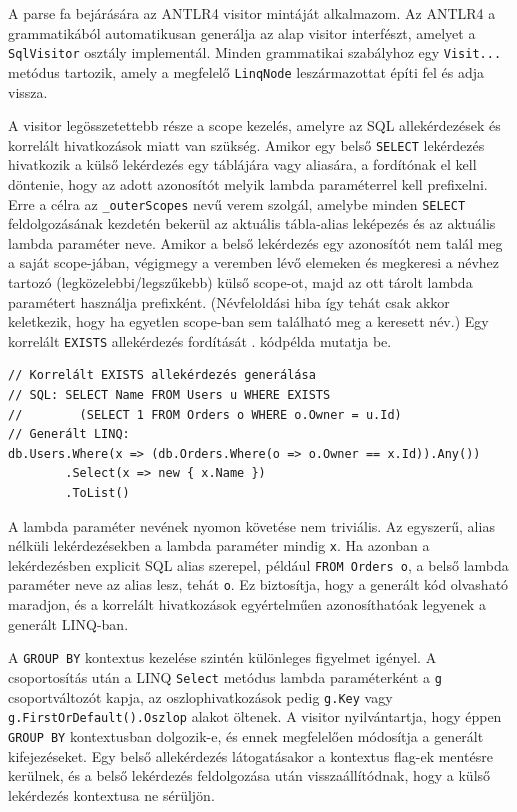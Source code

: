 \documentclass[a4paper,12pt]{article}
\begin{document}
A parse fa bejárására az ANTLR4 visitor mintáját alkalmazom. Az ANTLR4 a grammatikából automatikusan generálja az alap visitor interfészt, amelyet a \texttt{SqlVisitor} osztály implementál. Minden grammatikai szabályhoz egy \texttt{Visit...} metódus tartozik, amely a megfelelő \texttt{LinqNode} leszármazottat építi fel és adja vissza.

A visitor legösszetettebb része a scope kezelés, amelyre az SQL allekérdezések és korrelált hivatkozások miatt van szükség. Amikor egy belső \texttt{SELECT} lekérdezés hivatkozik a külső lekérdezés egy táblájára vagy aliasára, a fordítónak el kell döntenie, hogy az adott azonosítót melyik lambda paraméterrel kell prefixelni. Erre a célra az \texttt{\_outerScopes} nevű verem szolgál, amelybe minden \texttt{SELECT} feldolgozásának kezdetén bekerül az aktuális tábla-alias leképezés és az aktuális lambda paraméter neve. Amikor a belső lekérdezés egy azonosítót nem talál meg a saját scope-jában, végigmegy a veremben lévő elemeken és megkeresi a névhez tartozó (legközelebbi/legszűkebb) külső scope-ot, majd az ott tárolt lambda paramétert használja prefixként. (Névfeloldási hiba így tehát csak akkor keletkezik, hogy ha egyetlen scope-ban sem található meg a keresett név.) Egy korrelált \texttt{EXISTS} allekérdezés fordítását . kódpélda mutatja be.

\newpage

\begin{lstlisting}[caption={Korrelált allekérdezés scope kezelése}, label={lst:korrelalt}]
// Korrelált EXISTS allekérdezés generálása
// SQL: SELECT Name FROM Users u WHERE EXISTS 
//        (SELECT 1 FROM Orders o WHERE o.Owner = u.Id)
// Generált LINQ:
db.Users.Where(x => (db.Orders.Where(o => o.Owner == x.Id)).Any())
        .Select(x => new { x.Name })
        .ToList()
\end{lstlisting}

A lambda paraméter nevének nyomon követése nem triviális. Az egyszerű, alias nélküli lekérdezésekben a lambda paraméter mindig \texttt{x}. Ha azonban a lekérdezésben explicit SQL alias szerepel, például \texttt{FROM Orders o}, a belső lambda paraméter neve az alias lesz, tehát \texttt{o}. Ez biztosítja, hogy a generált kód olvasható maradjon, és a korrelált hivatkozások egyértelműen azonosíthatóak legyenek a generált LINQ-ban.

A \texttt{GROUP BY} kontextus kezelése szintén különleges figyelmet igényel. A csoportosítás után a LINQ \texttt{Select} metódus lambda paraméterként a \texttt{g} csoportváltozót kapja, az oszlophivatkozások pedig \texttt{g.Key} vagy \\\texttt{g.First\-OrDefault().Oszlop} alakot öltenek. A visitor nyilvántartja, hogy éppen \texttt{GROUP BY} kontextusban dolgozik-e, és ennek megfelelően módosítja a generált kifejezéseket. Egy belső allekérdezés látogatásakor a kontextus flag-ek mentésre kerülnek, és a belső lekérdezés feldolgozása után visszaállítódnak, hogy a külső lekérdezés kontextusa ne sérüljön.
\end{document}
